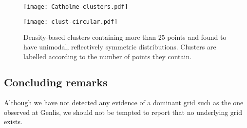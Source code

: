 \documentclass[../../ArchStats.tex]{subfiles}
\begin{document}
\begin{figure}[!ht]
\caption{Density-based clusters containing more than 25 points and found to have unimodal, reflectively symmetric distributions. Clusters are labelled according to the number of points they contain.} 
\begin{minipage}[t]{0.47\textwidth}
	\centering
	\label{fig:Cat-clusters}
 	\texttt{[image: Catholme-clusters.pdf]}
 \end{minipage}
 \hfill
	\begin{minipage}[t]{0.47\textwidth}
  		\centering
		\label{fig:clust-circ}
		\texttt{[image: clust-circular.pdf]}
    \end{minipage}
 \end{figure}
 
\subsection{Concluding remarks}
 
Although we have not detected any evidence of a dominant grid such as the one observed at Genlis, we should not be tempted to report that no underlying grid exists. 
\end{document}
